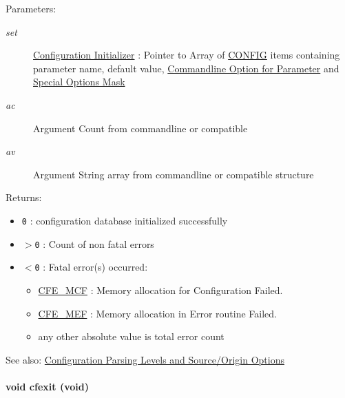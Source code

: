 \begin{Desc}
\item[Parameters:]
\begin{description}
\item[{\em set}]\hyperlink{config_initializer}{Configuration Initializer} : Pointer to Array of \hyperlink{struct_c_o_n_f_i_g}{CONFIG} items containing parameter name, default value, \hyperlink{config_initializer_parameter_option}{Commandline Option for Parameter} and \hyperlink{group__special__options__mask}{Special Options Mask}\item[{\em ac}]Argument Count from commandline or compatible\item[{\em av}]Argument String array from commandline or compatible structure\end{description}
\end{Desc}
\begin{Desc}
\item[Returns:]\begin{itemize}
\item {\tt 0} : configuration database initialized successfully \item {\tt $>$0} : Count of non fatal errors \item {\tt $<$0} : Fatal error(s) occurred:\begin{itemize}
\item \hyperlink{group__errors_g127dc37aea6ba5ef8d9dfe5cb9c629eb}{CFE\_\-MCF} : Memory allocation for Configuration Failed. \item \hyperlink{group__errors_g46fb52baac2d4b91c5169a2918caff5d}{CFE\_\-MEF} : Memory allocation in Error routine Failed. \item any other absolute value is total error count\end{itemize}
\end{itemize}
\end{Desc}
\begin{Desc}
\item[See also:]\hyperlink{config_levels}{Configuration Parsing Levels and Source/Origin Options} \end{Desc}
\hypertarget{group__cflib__core_g47bfff42f432b3e8b5b9f12b695e60db}{
\paragraph[{cfexit}]{\setlength{\rightskip}{0pt plus 5cm}void cfexit (void)}\hfill}
\label{group__cflib__core_g47bfff42f432b3e8b5b9f12b695e60db}



